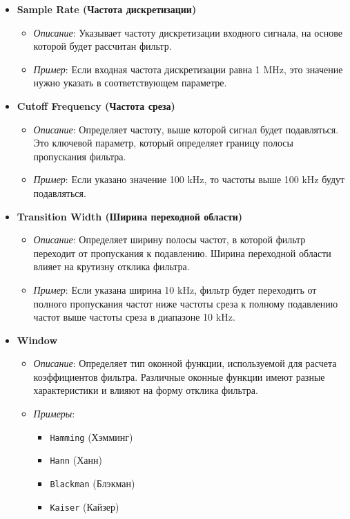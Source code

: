 \documentclass[a4paper,12pt]{extarticle}
\begin{document}
\begin{itemize}
    \item \textbf{Sample Rate (Частота дискретизации)}
    \begin{itemize}
        \item \textit{Описание}: Указывает частоту дискретизации входного сигнала, на основе которой будет рассчитан фильтр.
        \item \textit{Пример}: Если входная частота дискретизации равна 1 MHz, это значение нужно указать в соответствующем параметре.
    \end{itemize}

    \item \textbf{Cutoff Frequency (Частота среза)}
    \begin{itemize}
        \item \textit{Описание}: Определяет частоту, выше которой сигнал будет подавляться. Это ключевой параметр, который определяет границу полосы пропускания фильтра.
        \item \textit{Пример}: Если указано значение 100 kHz, то частоты выше 100 kHz будут подавляться.
    \end{itemize}

    \item \textbf{Transition Width (Ширина переходной области)}
    \begin{itemize}
        \item \textit{Описание}: Определяет ширину полосы частот, в которой фильтр переходит от пропускания к подавлению. Ширина переходной области влияет на крутизну отклика фильтра.
        \item \textit{Пример}: Если указана ширина 10 kHz, фильтр будет переходить от полного пропускания частот ниже частоты среза к полному подавлению частот выше частоты среза в диапазоне 10 kHz.
    \end{itemize}

    \item \textbf{Window}
    \begin{itemize}
        \item \textit{Описание}: Определяет тип оконной функции, используемой для расчета коэффициентов фильтра. Различные оконные функции имеют разные характеристики и влияют на форму отклика фильтра.
        \item \textit{Примеры}:
        \begin{itemize}
            \item \texttt{Hamming} (Хэмминг)
            \item \texttt{Hann} (Ханн)
            \item \texttt{Blackman} (Блэкман)
            \item \texttt{Kaiser} (Кайзер)
        \end{itemize}
    \end{itemize}


\end{itemize}
\end{document}
